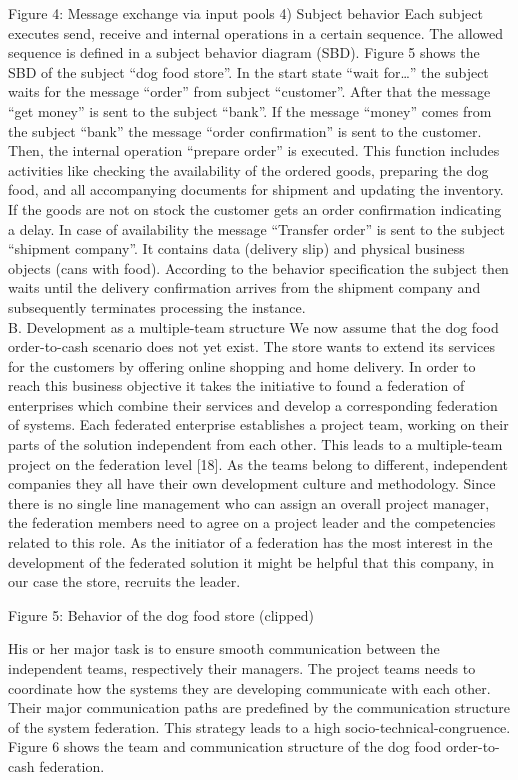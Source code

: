 Figure 4: Message exchange via input pools
4)	Subject behavior
Each subject executes send, receive and internal operations in a certain sequence. The allowed sequence is defined in a subject behavior diagram (SBD). Figure 5 shows the SBD of the subject “dog food store”. In the start state “wait for…” the subject waits for the message “order” from subject “customer”. After that the message “get money” is sent to the subject “bank”. If the message “money” comes from the subject “bank” the message “order confirmation” is sent to the customer. Then, the internal operation “prepare order” is executed. 
This function includes activities like checking the availability of the ordered goods, preparing the dog food, and all accompanying documents for shipment and updating the inventory. If the goods are not on stock the customer gets an order confirmation indicating a delay. In case of availability the message “Transfer order” is sent to the subject “shipment company”. It contains data (delivery slip) and physical business objects (cans with food). According to the behavior specification the subject then waits until the delivery confirmation arrives from the shipment company and subsequently terminates processing the instance. 
\\
B.	Development as a multiple-team structure
We now assume that the dog food order-to-cash scenario does not yet exist. The store wants to extend its services for the customers by offering online shopping and home delivery. In order to reach this business objective it takes the initiative to found a federation of enterprises which combine their services and develop a corresponding federation of systems.
Each federated enterprise establishes a project team, working on their parts of the solution independent from each other. This leads to a multiple-team project on the federation level [18]. As the teams belong to different, independent companies they all have their own development culture and methodology.
Since there is no single line management who can assign an overall project manager, the federation members need to agree on a project leader and the competencies related to this role. As the initiator of a federation has the most interest in the development of the federated solution it might be helpful that this company, in our case the store, recruits the leader.


Figure 5: Behavior of the dog food store (clipped)

His or her major task is to ensure smooth communication between the independent teams, respectively their managers. The project teams needs to coordinate how the systems they are developing communicate with each other. Their major communication paths are predefined by the communication structure of the system federation. This strategy leads to a high socio-technical-congruence. Figure 6 shows the team and communication structure of the dog food order-to-cash federation.

